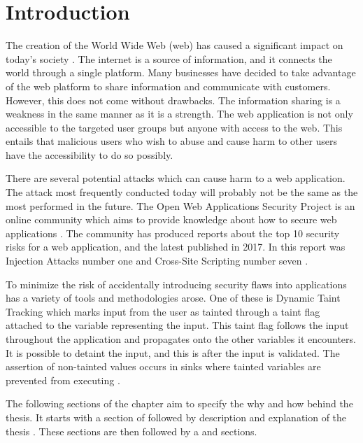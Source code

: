 \chapter{Introduction}
\label{Introduction}

The creation of the World Wide Web (web) has caused a significant impact on today's society \parencite{www}. The internet is a source of information, and it connects the world through a single platform. Many businesses have decided to take advantage of the web platform to share information and communicate with customers. However, this does not come without drawbacks. The information sharing is a weakness in the same manner as it is a strength. The web application is not only accessible to the targeted user groups but anyone with access to the web. This entails that malicious users who wish to abuse and cause harm to other users have the accessibility to do so possibly.

There are several potential attacks which can cause harm to a web application. The attack most frequently conducted today will probably not be the same as the most performed in the future. The Open Web Applications Security Project is an online community which aims to provide knowledge about how to secure web applications \parencite{OpenWebApplicationSecurityProject}. The community has produced reports about the top 10 security risks for a web application, and the latest published in 2017. In this report was Injection Attacks number one and Cross-Site Scripting number seven \parencite{OWASP2017, OpenWebApplicationSecurityProject, CrossMichael2007Dgtw}.

To minimize the risk of accidentally introducing security flaws into applications has a variety of tools and methodologies arose. One of these is Dynamic Taint Tracking which marks input from the user as tainted through a taint flag attached to the variable representing the input. This taint flag follows the input throughout the application and propagates onto the other variables it encounters. It is possible to detaint the input, and this is after the input is validated. The assertion of non-tainted values occurs in sinks where tainted variables are prevented from executing \parencite{Pan2015, Venkataramani2008}. 

The following sections of the chapter aim to specify the why and how behind the thesis. It starts with a section of \textit{} followed by \textit{} description and explanation of the thesis \textit{}. These sections are then followed by a \textit{} and \textit{} sections.



